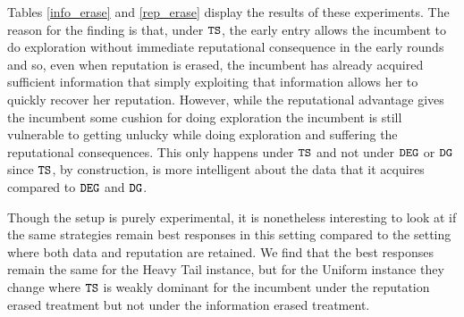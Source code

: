 \documentclass[../competing_bandits.tex]{subfiles}
\begin{document}
Tables \ref{info_erase} and \ref{rep_erase} display the results of these experiments. The reason for the finding is that, under $\mathtt{TS}$, the early entry allows the incumbent to do exploration without immediate reputational consequence in the early rounds and so, even when reputation is erased, the incumbent has already acquired sufficient information that simply exploiting that information allows her to quickly recover her reputation. However, while the reputational advantage gives the incumbent some cushion for doing exploration the incumbent is still vulnerable to getting unlucky while doing exploration and suffering the reputational consequences. This only happens under $\mathtt{TS}$ and not under $\mathtt{DEG}$ or $\mathtt{DG}$ since $\mathtt{TS}$, by construction, is more intelligent about the data that it acquires compared to $\mathtt{DEG}$ and $\mathtt{DG}$.

Though the setup is purely experimental, it is nonetheless interesting to look at if the same strategies remain best responses in this setting compared to the setting where both data and reputation are retained. We find that the best responses remain the same for the Heavy Tail instance, but for the Uniform instance they change where $\mathtt{TS}$ is weakly dominant for the incumbent under the reputation erased treatment but not under the information erased treatment.
\end{document}
